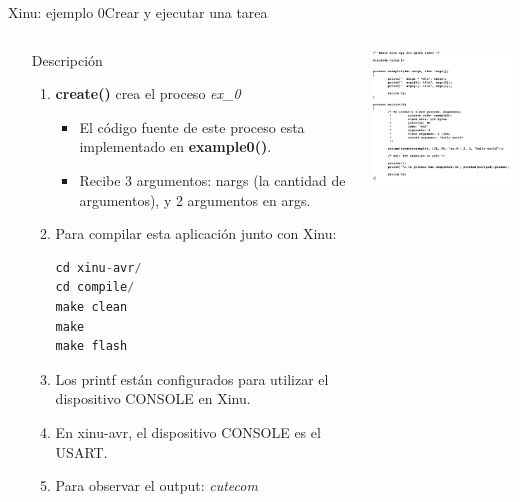 \documentclass[8pt,aspectratio=169,compress]{beamer}
\begin{document}
\begin{frame}[fragile]{Xinu: ejemplo 0}{Crear y ejecutar una tarea}

    \begin{columns}[onlytextwidth,T]
      \column{\dimexpr\linewidth-70mm-5mm}

\begin{small}
	\begin{itemize}
\bigskip
  \item[Descripción]
\begin{enumerate}
\item \textbf{create()} crea el proceso \textit{ex\_0}
\begin{itemize}
\item El código fuente de este proceso esta implementado en \textbf{example0()}.
\item Recibe 3 argumentos: nargs (la cantidad de argumentos), y 2 argumentos en args.
\end{itemize}

\bigskip
\item Para compilar esta aplicación junto con Xinu: 

\begin{lstlisting}[language=c,basicstyle=\footnotesize]
cd xinu-avr/
cd compile/
make clean
make
make flash
\end{lstlisting}
\bigskip
\item Los printf están configurados para utilizar el dispositivo CONSOLE en Xinu. 

\bigskip
\item En xinu-avr, el dispositivo CONSOLE es el USART.

\bigskip
\item Para observar el output: \textit{cutecom}
\end{enumerate}
	\end{itemize}

\end{small}

      \column{60mm}
     \includegraphics[width=62mm]{images/ejemplo0.jpg}

    \end{columns}
\end{frame}
\end{document}
